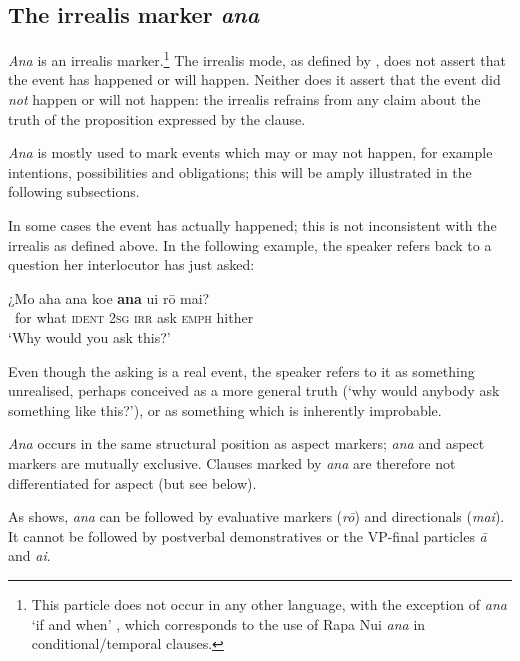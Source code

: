 \subsection{The irrealis marker \textit{ana}}\label{sec:11.5.2}
\textit{Ana} is an irrealis marker.\footnote{\label{fn:521}This particle does not occur in any other language, with the exception of  \textit{ana} ‘if and when’ \citep[130]{Biggs1973}, which corresponds to the use of Rapa Nui \textit{ana} in conditional/temporal clauses.} The irrealis mode, as defined by \citet[244]{Payne1997}, does not assert that the event has happened or will happen. Neither does it assert that the event did \textit{not} happen or will not happen: the irrealis refrains from any claim about the truth of the proposition expressed by the clause. 

\textit{Ana} is mostly used to mark events which may or may not happen, for example intentions, possibilities and obligations; this will be amply illustrated in the following subsections.

In some cases the event has actually happened; this is not inconsistent with the irrealis as defined above. In the following example, the speaker refers back to a question her interlocutor has just asked:

\ea\label{ex:11.164}
\gll ¿Mo aha {\ꞌ}ana koe \textbf{ana} {\ꞌ}ui rō mai?\\
~for what \textsc{ident} \textsc{2sg} \textsc{irr} ask \textsc{emph} hither\\

\glt
‘Why would you ask this?’ \textstyleExampleref{[R315.028]} 
\z

Even though the asking is a real event, the speaker refers to it as something unrealised, perhaps conceived as a more general truth (‘why would anybody ask something like this?’), or as something which is inherently improbable.

\textit{Ana} occurs in the same structural position as aspect markers; \textit{ana} and aspect markers are mutually exclusive. Clauses marked by \textit{ana} are therefore not differentiated for aspect (but see  below).

As  shows, \textit{ana} can be followed by evaluative markers (\textit{rō}) and directionals (\textit{mai}). It cannot be followed by postverbal demonstratives or the VP{}-final particles \textit{{\ꞌ}ā} and \textit{{\ꞌ}ai}.

